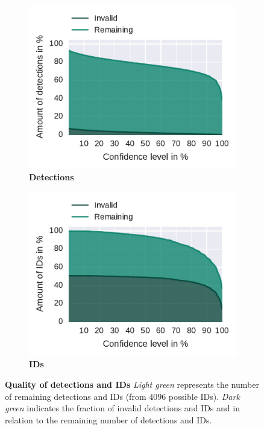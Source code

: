 \begin{figure}
    \centering
    \begin{subfigure}[b]{0.5\textwidth}
        \includegraphics[width=\textwidth]{Figures/detectionsWrongConf}
        \caption[Detections]{\textbf{Detections}}
        \label{fig:detections}
    \end{subfigure}%
    \begin{subfigure}[b]{0.5\textwidth}
        \includegraphics[width=\textwidth]{Figures/idsWrongConf}
        \caption[IDs]{\textbf{IDs}}
        \label{fig:ids}
    \end{subfigure}
 	\caption[Quality of detections and IDs]{\textbf{Quality of detections and IDs} \emph{Light green} represents the number of remaining detections and IDs (from $4096$ possible IDs). \emph{Dark green} indicates the fraction of invalid detections and IDs and in relation to the remaining number of detections and IDs.\protect\footnotemark}
 	\label{fig:remainingVSquality}
\end{figure}

